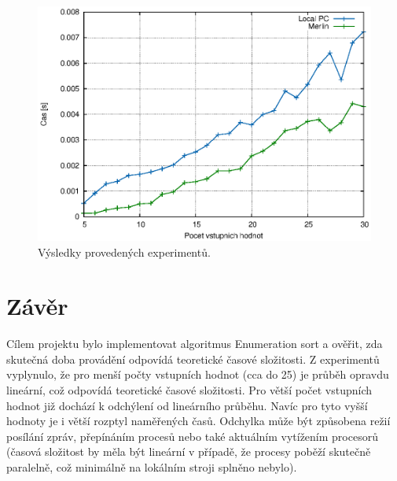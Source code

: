 \documentclass[a4paper,12pt]{article}
\begin{document}
\begin{figure}[h]
  \centering
  \includegraphics{Figures/merge-res.eps}
  \caption{Výsledky provedených experimentů.}
  \label{fig:exp}
\end{figure}

\section{Závěr}
Cílem projektu bylo implementovat algoritmus Enumeration sort a ověřit, zda skutečná doba provádění 
odpovídá teoretické časové složitosti. Z 
experimentů vyplynulo, že pro menší počty vstupních hodnot (cca do 25) je průběh opravdu lineární, 
což odpovídá teoretické časové složitosti. Pro větší počet vstupních hodnot již dochází k odchýlení 
od lineárního průběhu. Navíc pro tyto vyšší hodnoty je i větší rozptyl naměřených časů. Odchylka může být 
způsobena režií posílání zpráv, přepínáním procesů nebo také aktuálním vytížením procesorů 
(časová složitost by měla být lineární v případě, že procesy poběží skutečně paralelně, což minimálně 
na lokálním stroji splněno nebylo).
\end{document}
